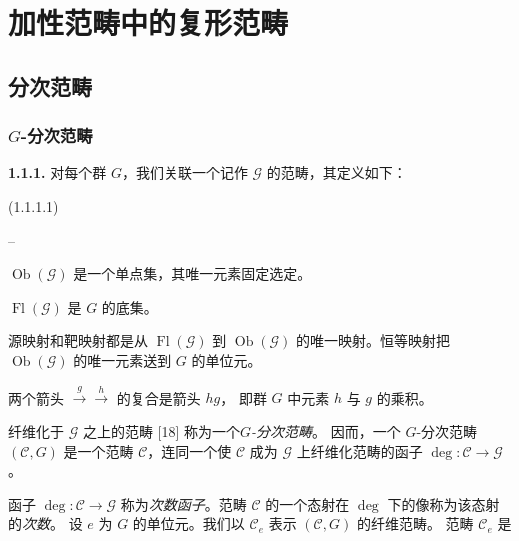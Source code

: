 \chapter{加性范畴中的复形范畴}

\section{分次范畴}

\subsection{\texorpdfstring{$G$}{G}-分次范畴}

\noindent\textbf{1.1.1.}\quad
对每个群 $G$，我们关联一个记作 $\mathcal G$ 的范畴，其定义如下：

\noindent\textnormal{(1.1.1.1)}
\begin{list}{--}{%
  \setlength{\leftmargin}{2em}%
  \setlength{\itemsep}{0.25em}%
  \setlength{\topsep}{0.25em}%
}
  \item {}%
    $\operatorname{Ob}(\mathcal G)$ 是一个单点集，其唯一元素固定选定。
  \item {}%
    $\operatorname{Fl}(\mathcal G)$ 是 $G$ 的底集。
  \item {}%
    源映射和靶映射都是从 $\operatorname{Fl}(\mathcal G)$ 到
    $\operatorname{Ob}(\mathcal G)$ 的唯一映射。恒等映射把
    $\operatorname{Ob}(\mathcal G)$ 的唯一元素送到 $G$ 的单位元。
  \item {}%
    两个箭头 ${}\xrightarrow{g}{}\xrightarrow{h}{}$ 的复合是箭头 $hg$，
    即群 $G$ 中元素 $h$ 与 $g$ 的乘积。
\end{list}

纤维化于 $\mathcal G$ 之上的范畴 [18] 称为一个\emph{$G$-分次范畴}。
因而，一个 $G$-分次范畴 $(\mathcal C,G)$ 是一个范畴 $\mathcal C$，连同一个使
$\mathcal C$ 成为 $\mathcal G$ 上纤维化范畴的函子
$\deg\colon\mathcal C\to\mathcal G$。

函子 $\deg\colon\mathcal C\to\mathcal G$ 称为\emph{次数函子}。范畴
$\mathcal C$ 的一个态射在 $\deg$ 下的像称为该态射的\emph{次数}。
设 $e$ 为 $G$ 的单位元。我们以 $\mathcal C_e$ 表示 $(\mathcal C,G)$ 的纤维范畴。
范畴 $\mathcal C_e$ 是
